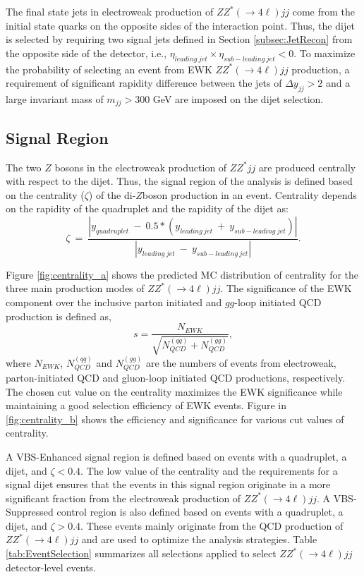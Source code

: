The final state jets in electroweak production of $ZZ^*(\rightarrow 4\ell) jj$ come from the initial state quarks on the opposite sides of the interaction point. Thus, the dijet is selected by requiring two signal jets defined in Section \ref{subsec:JetRecon} from the opposite side of the detector, i.e., $\eta_{leading~jet} \times \eta_{sub-leading~jet} < 0$. To maximize the probability of selecting an event from EWK $ZZ^*(\rightarrow 4\ell)jj$ production, a requirement of significant rapidity difference between the jets of $\Delta y_{jj}> 2 $ and a large invariant mass of $m_{jj} > 300 $ GeV are imposed on the dijet selection. 

\subsection{Signal Region}
\label{subsec:SignalRegion}
The two $Z$ bosons in the electroweak production of $ZZ^*jj$ are produced centrally with respect to the dijet. Thus, the signal region of the analysis is defined based on the centrality ($\zeta$) of the di-$Z$boson production in an event. Centrality depends on the rapidity of the quadruplet and the rapidity of the dijet as:
\begin{equation}
    \zeta~=~\frac{|y_{quadruplet}~-~ 0.5*(y_{leading~jet}~+~y_{sub-leading~jet})| }{|y_{leading~jet}~-~y_{sub-leading~jet}|}.
    \label{eq:centr}
\end{equation}

Figure \ref{fig:centrality_a} shows the predicted MC distribution of centrality for the three main production modes of $ZZ^*(\rightarrow 4 \ell)jj$. The significance of the EWK component over the inclusive parton initiated and $gg$-loop initiated QCD production is defined as, 
\begin{equation}
    s=\frac{N_{EWK}}{\sqrt{N_{QCD}^{(qq)}+N_{QCD}^{(gg)}}},
    \label{eqn:EWKSignificance}
\end{equation}
where $N_{EWK}$, $N_{QCD}^{(qq)}$ and $N_{QCD}^{(gg)}$ are the numbers of events from electroweak, parton-initiated QCD and gluon-loop initiated QCD productions, respectively. The chosen cut value on the centrality maximizes the EWK significance while maintaining a good selection efficiency of EWK events. Figure in \ref{fig:centrality_b} shows the efficiency and significance for various cut values of centrality.  

A VBS-Enhanced signal region is defined based on events with a quadruplet, a dijet, and $\zeta<0.4$. The low value of the centrality and the requirements for a signal dijet ensures that the events in this signal region originate in a more significant fraction from the electroweak production of $ZZ^*(\rightarrow 4 \ell) jj$. A VBS-Suppressed control region is also defined based on events with a quadruplet, a dijet, and $\zeta>0.4$. These events mainly originate from the QCD production of $ZZ^*(\rightarrow 4 \ell) jj$ and are used to optimize the analysis strategies. Table \ref{tab:EventSelection} summarizes all selections applied to select $ZZ^*(\rightarrow 4\ell)jj$ detector-level events.

